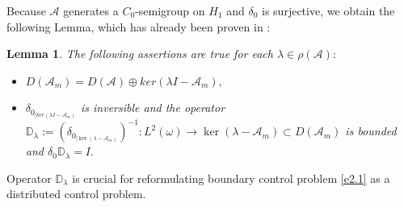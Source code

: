 \documentclass[10pt, a4]{amsart}
\theoremstyle{plain}
\newtheorem{lemma}{Lemma}[section]
\theoremstyle{definition}
\theoremstyle{remark}
\numberwithin{equation}{section}
\begin{document}
 Because \(\mathcal{A}\) generates a \(C_0\)-semigroup on \(H_1\) and \(\delta_{0}\) is surjective, we obtain the following Lemma, which has already been proven in \cite{ref77} :
\begin{lemma}\label{l2.3}
The following assertions are true for each $\lambda\in \rho(\mathcal{A}) :$
\begin{itemize}
\item[(i)]$D(\mathcal{A}_m)=D(\mathcal{A})\oplus ker(\lambda I-\mathcal{A}_m),$
\item[(ii)] $\delta_{0_{\mid ker(\lambda I-\mathcal{A}_m)}}$ is inversible and the operator $\mathbb{D}_{\lambda}:=\left(\delta_{0_{|\ker(\lambda-\mathcal{A}_m)}}\right)^{-1}:L^2(\omega)\longrightarrow \ker (\lambda-\mathcal{A}_m)\subset D(\mathcal{A}_m)$ is bounded and $\delta_0\mathbb{D}_{\lambda}=I.$
\end{itemize}
\end{lemma}
Operator $\mathbb{D}_{\lambda}$ is crucial for reformulating boundary control problem \eqref{e2.1} as a distributed control problem.
\end{document}
